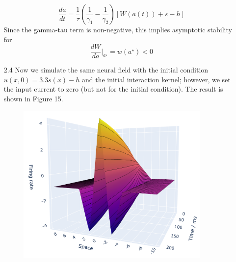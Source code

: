 \documentclass[12pt]{article}
\begin{document}
\begin{enumerate}
\[
    \frac{da}{dt} = \frac{1}{\tau}\left( \frac{1}{\gamma_{1}} - \frac{1}{\gamma_{2}} \right)[W(a(t))+s-h]
\]
Since the gamma-tau term is non-negative, this implies asymptotic stability for 
\[
    \frac{dW}{da}\bigg|_{a^{\star}} = w(a^{\star}) < 0
\]
\item[2.4] Now we simulate the same neural field with the initial condition $u(x, 0)=3.3s(x)-h$ and the initial interaction kernel;
however, we set the input current to zero (but not for the initial condition). The result is shown in Figure 15. 
\begin{figure}[H]
    \centering
    \includegraphics[width=0.9\textwidth]{./figure15.png}

\end{figure}
\end{enumerate}
\end{document}
